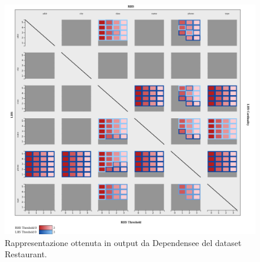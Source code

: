 \begin{figure}[ht]
    \centering
    \includegraphics[width=\linewidth]{capitoli/figure/restaurant}
    \caption{Rappresentazione ottenuta in output da Dependensee del dataset Restaurant.}
    \label{fig:restaurant_result}
\end{figure}
